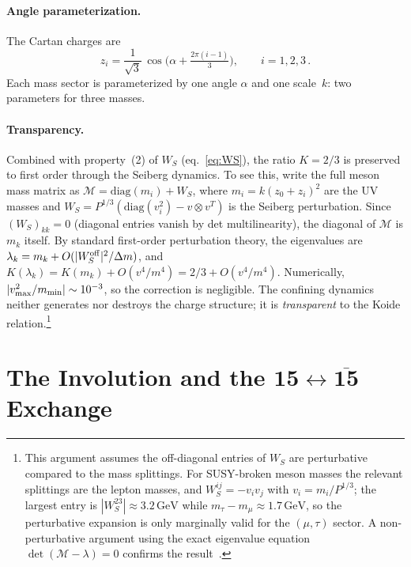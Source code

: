 \documentclass[12pt,a4paper]{article}
\newcommand{\diag}{\mathrm{diag}}
\newcommand{\GeV}{\,\mathrm{GeV}}
\begin{document}
\paragraph{Angle parameterization.}
The Cartan charges are
\begin{equation}
  z_i = \frac{1}{\sqrt{3}}\,\cos\!\bigl(\alpha + \tfrac{2\pi (i-1)}{3}\bigr),
  \qquad i = 1,2,3\,.
  \label{eq:zi}
\end{equation}
Each mass sector is parameterized by one angle $\alpha$ and one
scale~$k$: two parameters for three masses.

\paragraph{Transparency.}
Combined with property~(2) of $W_S$ (eq.~\ref{eq:WS}), the ratio
$K=2/3$ is preserved to first order through the Seiberg dynamics.
To see this, write the full meson mass matrix as
$\mathcal{M} = \diag(m_i) + W_S$, where $m_i = k(z_0{+}z_i)^2$
are the UV masses and $W_S = P^{1/3}(\diag(v_i^2) - v\otimes v^T)$
is the Seiberg perturbation. Since $(W_S)_{kk} = 0$ (diagonal entries
vanish by det multilinearity), the diagonal of $\mathcal{M}$ is
$m_k$ itself. By standard first-order perturbation theory,
the eigenvalues are $\lambda_k = m_k + O(|W_S^{\rm off}|^2/\Delta m)$,
and $K(\lambda_k) = K(m_k) + O(v^4/m^4) = 2/3 + O(v^4/m^4)$.
Numerically, $|v^2_{\rm max}/m_{\rm min}| \sim 10^{-3}$,
so the correction is negligible. The confining dynamics
neither generates nor destroys the charge structure; it is
\emph{transparent} to the Koide relation.\footnote{This
argument assumes the off-diagonal entries of $W_S$ are perturbative
compared to the mass splittings. For SUSY-broken meson masses the
relevant splittings are the lepton masses, and $W_S^{ij} = -v_iv_j$
with $v_i = m_i/P^{1/3}$; the largest entry is
$|W_S^{23}| \approx 3.2\GeV$ while $m_\tau - m_\mu \approx 1.7\GeV$,
so the perturbative expansion is only marginally valid for the
$(\mu,\tau)$ sector. A non-perturbative argument using the
exact eigenvalue equation $\det(\mathcal{M} - \lambda) = 0$ confirms
the result~\cite{Rivero:2024epjc}.}


\section{The Involution and the
  $\mathbf{15} \leftrightarrow \overline{\mathbf{15}}$ Exchange}
\label{sec:involution}
\end{document}
